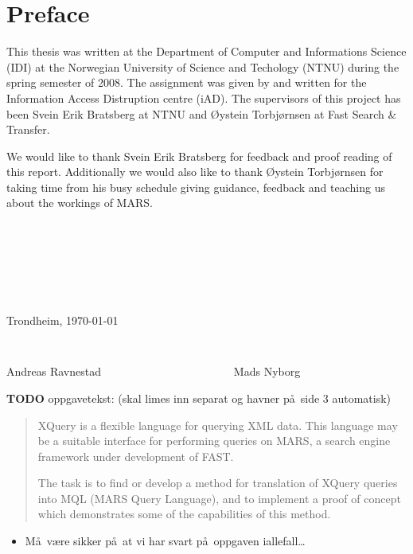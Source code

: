 \chapter*{Preface}

This thesis was written at the Department of Computer and Informations Science
(IDI) at the Norwegian University of Science and Techology (NTNU) during the
spring semester of 2008. The assignment was given by and written for the
Information Access Distruption centre (iAD). The supervisors of this project
has been Svein Erik Bratsberg at NTNU and \O ystein Torbj\o rnsen at Fast
Search \& Transfer.

We would like to thank Svein Erik Bratsberg for feedback and proof reading of
this report. Additionally we would also like to thank \O ystein Torbj\o rnsen
for taking time from his busy schedule giving guidance, feedback and teaching
us about the workings of MARS.

\begin{verbatim}







\end{verbatim}
\begin{center}

Trondheim, \today

\begin{verbatim}


\end{verbatim}
Andreas Ravnestad \verb!                      ! Mads Nyborg
\end{center}

\textbf{\LARGE TODO} oppgavetekst: (skal limes inn separat og havner p\aa~side 3 automatisk)

\begin{quote}
XQuery is a flexible language for querying XML data. This language may be a
suitable interface for performing queries on MARS, a search engine
framework under development of FAST.

The task is to find or develop a method for translation of XQuery queries into
MQL (MARS Query Language), and to implement a proof of concept which
demonstrates some of the capabilities of this method.

\end{quote}

\begin{itemize}
  \item M\aa~v\ae re sikker p\aa~at vi har svart p\aa~oppgaven iallefall\ldots
\end{itemize}
